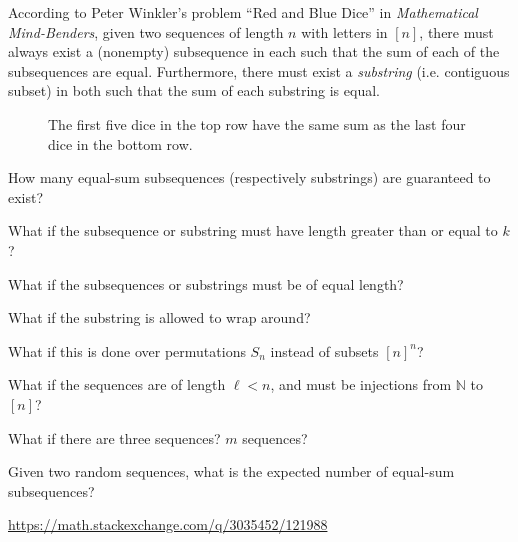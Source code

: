 \documentclass{article}
\begin{document}
According to Peter Winkler's problem ``Red and Blue Dice'' in
\textit{Mathematical Mind-Benders}, given two sequences of length $n$ with
letters in $[n]$, there must always exist a (nonempty) subsequence in each such
that the sum of each of the subsequences are equal.
Furthermore, there must exist a \textit{substring} (i.e. contiguous subset) in
both such that the sum of each substring is equal.
\begin{figure}[ht!]
  \centering
  \caption{
    The first five dice in the top row have the same sum as the last four dice
    in the bottom row.
  }
\end{figure}

\begin{question}
  How many equal-sum subsequences (respectively substrings) are guaranteed to
  exist?
\end{question}

\begin{related}
  \item What if the subsequence or substring must have length greater than or
    equal to $k$?
  \item What if the subsequences or substrings must be of equal length?
  \item What if the substring is allowed to wrap around?
  \item What if this is done over permutations $S_n$ instead of subsets $[n]^n$?
  \item What if the sequences are of length $\ell < n$, and must be injections
  from $\mathbb N$ to $[n]$?
  \item What if there are three sequences? $m$ sequences?
  \item Given two random sequences, what is the expected number of equal-sum
  subsequences?
\end{related}


\begin{references}
  \item \url{https://math.stackexchange.com/q/3035452/121988}
\end{references}
\end{document}
